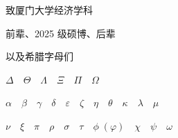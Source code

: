\begin{titlepage}
  \centering
  \vspace*{6cm}

{\LARGE\kaiti
\strut 致厦门大学经济学科\\
\strut 前辈、{\Large{2025}} 级硕博、后辈\\[16pt]
\strut 以及希腊字母们\\
\strut {\Large$\Delta\quad\Theta\quad\Lambda\quad\Xi\quad\Pi\quad\Omega$}\\
\strut {\Large$\alpha\quad\beta\quad\gamma\quad\delta\quad\varepsilon\quad\zeta\quad\eta\quad\theta\quad\kappa\quad\lambda\quad\mu$}\\
\strut {\Large$\nu\quad\xi\quad\pi\quad\rho\quad\sigma\quad\tau\quad\phi\;(\varphi)\quad\chi\quad\psi\quad\omega$}}

\end{titlepage}
